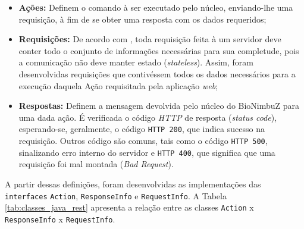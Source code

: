 \begin{itemize}
	\item \textbf{Ações:} Definem o comando à ser executado pelo núcleo, enviando-lhe uma requisição, à fim de se obter uma resposta com os dados requeridos;
	\item \textbf{Requisições:} De acordo com \cite{rest}, toda requisição feita à um servidor deve conter todo o conjunto de informações necessárias para sua completude, pois a comunicação não deve manter estado (\textit{stateless}). Assim, foram desenvolvidas requisições que contivéssem todos os dados necessários para a execução daquela Ação requisitada pela aplicação \textit{web};
	\item \textbf{Respostas:} Definem a mensagem devolvida pelo núcleo do BioNimbuZ para uma dada ação. É verificada o código \textit{HTTP} de resposta (\textit{status code}), esperando-se, geralmente, o código \texttt{HTTP 200}, que indica sucesso na requisição. Outros código são comuns, tais como o código \texttt{HTTP 500}, sinalizando erro interno do servidor e \texttt{HTTP 400}, que significa que uma requisição foi mal montada (\textit{Bad Request}).
\end{itemize} 

A partir dessas definições, foram desenvolvidas as implementações das \texttt{interfaces} \texttt{Action}, \texttt{ResponseInfo} e \texttt{RequestInfo}. A Tabela \ref{tab:classes_java_rest} apresenta a relação entre as classes \texttt{Action} x \texttt{ResponseInfo} x \texttt{RequestInfo}.

